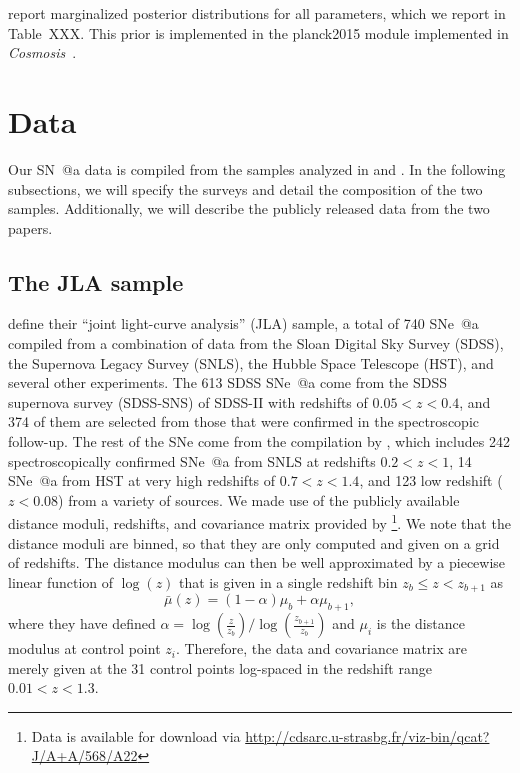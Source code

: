 \documentclass[12pt,a4paper]{article}
\makeatletter
\newcommand\Cosmosis{{\it Cosmosis}\ }
\newcommand*{\rom}[1]{\expandafter\@slowromancap\romannumeral #1@}
\newcommand{\sne}{\mbox{SNe}}
\newcommand{\sna}{\mbox{SN \rom{1}a}}
\newcommand{\snea}{\mbox{SNe \rom{1}a}}
\makeatother
\begin{document}
\citet{planck2013} report marginalized
posterior distributions for all parameters,
which we report in Table~XXX. This prior is implemented
in the planck2015 module implemented in \Cosmosis \citep{cosmosis}.

\section{Data}
\label{sec:data}
Our {\sna} data is compiled from the samples analyzed in 
\citet{betoule2014} and \citet{rest2014}. In the following subsections, 
we will specify the surveys and detail the composition of the two samples. 
Additionally, we will describe the publicly released data from the two papers.

\subsection{The JLA sample}
\label{sec:betoule}

\citet{betoule2014} define their ``joint light-curve analysis'' (JLA) 
sample, a total of 740 \snea{} compiled from a combination of 
data from the Sloan Digital Sky 
Survey (SDSS), the Supernova Legacy Survey (SNLS), the Hubble Space 
Telescope (HST), and several other experiments. The 613 SDSS \snea{} 
come from the SDSS supernova survey (SDSS-SNS) of SDSS-II \citep{sako2014} 
with redshifts of $0.05 < z < 0.4$, and 374 of them are selected from those 
that were confirmed in the spectroscopic follow-up. The rest of the 
\sne{} come from the compilation by \citet{conley2011}, which includes 
242 spectroscopically confirmed \snea{} from SNLS at redshifts $0.2 < z < 1$, 
14 \snea{} from HST at very high redshifts of $0.7 < z < 1.4$, and 123 
low redshift ($z < 0.08$) from a variety of sources. We made use of the 
publicly available distance moduli, redshifts, and covariance 
matrix provided by \citet{betoule2014}\footnote{Data is available 
for download via 
\url{http://cdsarc.u-strasbg.fr/viz-bin/qcat?J/A+A/568/A22}}. 
We note that the distance moduli are binned, so that they are only computed and 
given on a grid of redshifts. The distance modulus can then be well 
approximated by a piecewise linear function of $\log(z)$ that is given 
in a single redshift bin $z_b \le z < z_{b+1}$ as 
\citep[see][Appendix E.1]{betoule2014}
\begin{equation}
\label{eq:binnedMu}
\bar{\mu}(z) = (1 - \alpha) \mu_b + \alpha \mu_{b+1},
\end{equation}
where they have defined 
$\alpha = \log\left(\frac{z}{z_b}\right)/\log\left(\frac{z_{b+1}}{z_b}\right)$ 
and $\mu_i$ is the distance modulus at control point $z_i$. 
Therefore, the data and covariance matrix are merely given at the 
31 control points log-spaced in the redshift range $0.01 < z < 1.3$.
\end{document}

